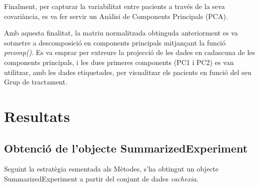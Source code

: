 \documentclass[
  a4paper]{article}
\begin{document}
Finalment, per capturar la variabilitat entre pacients a través de la
seva covariància, es va fer servir un Anàlisi de Components Principals
(PCA).

Amb aquesta finalitat, la matriu normalitzada obtinguda anteriorment es
va sotmetre a descomposició en components principals mitjançant la
funció \emph{prcomp()}. Es va emprar per extreure la projecció de les
dades en cadascuna de les components principals, i les dues primeres
components (PC1 i PC2) es van utilitzar, amb les dades etiquetades, per
visualitzar els pacients en funció del seu Grup de tractament.

\pagebreak

\section{Resultats}\label{resultats}

\subsection{Obtenció de l'objecte
SummarizedExperiment}\label{obtenciuxf3-de-lobjecte-summarizedexperiment}

Seguint la estratègia esmentada als Mètodes, s'ha obtingut un objecte
SummarizedExperiment a partir del conjunt de dades \emph{cachexia}.

\begin{table}
\centering
\caption{Dimensions de l'objecte SummarizedExperiment `dades`.}
\centering
{}
\end{table}
\end{document}
